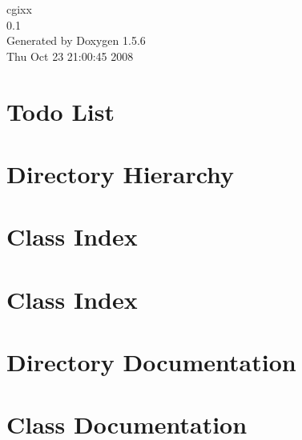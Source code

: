 \documentclass[a4paper]{book}
\begin{document}
\begin{titlepage}
\vspace*{7cm}
\begin{center}
{\Large cgixx \\[1ex]\large 0.1 }\\
\vspace*{1cm}
{\large Generated by Doxygen 1.5.6}\\
\vspace*{0.5cm}
{\small Thu Oct 23 21:00:45 2008}\\
\end{center}
\end{titlepage}
\clearemptydoublepage
{}
\tableofcontents
\clearemptydoublepage
{}
\chapter{Todo List}
\label{todo}

\chapter{Directory Hierarchy}

\chapter{Class Index}

\chapter{Class Index}

\chapter{Directory Documentation}







\chapter{Class Documentation}

























\printindex
\end{document}
